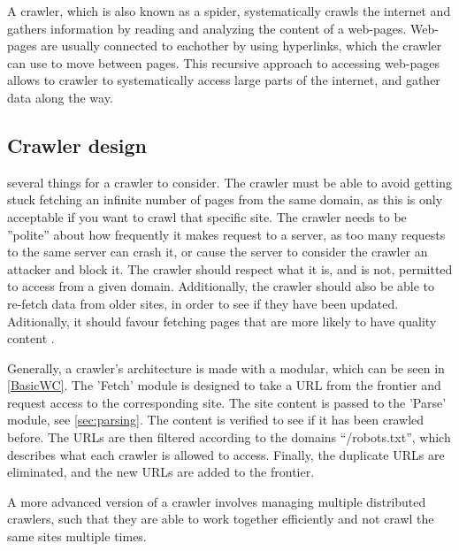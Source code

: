 A crawler, which is also known as a spider, systematically crawls the internet
and gathers information by reading and analyzing the content of a web-pages.
Web-pages are usually connected to eachother by using hyperlinks, which the
crawler can use to move between pages. This recursive approach to accessing
web-pages allows to crawler to systematically access large parts of the
internet, and gather data along the way.

\subsection{Crawler design}%
several things for a crawler to consider.
The crawler must be able to avoid getting stuck fetching an infinite number of
pages from the same domain, as this is only acceptable if you want to crawl that
specific site.
The crawler needs to be ''polite'' about how frequently it makes request to a
server, as too many requests to the same server can crash it, or cause the
server to consider the crawler an attacker and block it.
The crawler should respect what it is, and is not, permitted to access from a
given domain. Additionally, the crawler should also be able to re-fetch data
from older sites, in order to see if they have been updated. Aditionally, it
should favour fetching pages that are more likely to have quality content \citep[Ch.
20.1]{manning2008introduction}.\nl
 
Generally, a crawler's architecture is made with a modular, which
can be seen in \autoref{BasicWC}. 
The 'Fetch' module is designed to take a URL from the
frontier and request access to the corresponding site. 
The site content is passed to the 'Parse' module, see \autoref{sec:parsing}.
The content is verified to see if it has been crawled before. The URLs are then
filtered according to the domains ``/robots.txt'', which describes what each
crawler is allowed to access. Finally, the duplicate URLs are eliminated, and
the new URLs are added to the frontier.\nl




A more advanced version of a crawler involves managing multiple distributed
crawlers, such that they are able to work together efficiently and not crawl
the same sites multiple times.


